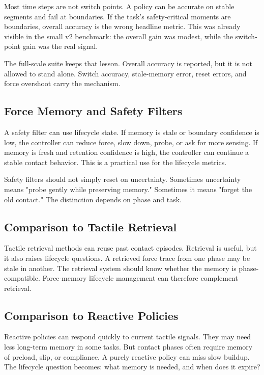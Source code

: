 \documentclass{article}
\begin{document}
Most time steps are not switch points. A policy can be accurate on stable
segments and fail at boundaries. If the task's safety-critical moments are
boundaries, overall accuracy is the wrong headline metric. This was already
visible in the small v2 benchmark: the overall gain was modest, while the
switch-point gain was the real signal.

The full-scale suite keeps that lesson. Overall accuracy is reported, but it is
not allowed to stand alone. Switch accuracy, stale-memory error, reset errors,
and force overshoot carry the mechanism.

\subsection{Force Memory and Safety Filters}

A safety filter can use lifecycle state. If memory is stale or boundary
confidence is low, the controller can reduce force, slow down, probe, or ask
for more sensing. If memory is fresh and retention confidence is high, the
controller can continue a stable contact behavior. This is a practical use for
the lifecycle metrics.

Safety filters should not simply reset on uncertainty. Sometimes uncertainty
means "probe gently while preserving memory." Sometimes it means "forget the
old contact." The distinction depends on phase and task.

\subsection{Comparison to Tactile Retrieval}

Tactile retrieval methods can reuse past contact episodes. Retrieval is useful,
but it also raises lifecycle questions. A retrieved force trace from one phase
may be stale in another. The retrieval system should know whether the memory is
phase-compatible. Force-memory lifecycle management can therefore complement
retrieval.

\subsection{Comparison to Reactive Policies}

Reactive policies can respond quickly to current tactile signals. They may need
less long-term memory in some tasks. But contact phases often require memory of
preload, slip, or compliance. A purely reactive policy can miss slow buildup.
The lifecycle question becomes: what memory is needed, and when does it expire?
\end{document}

